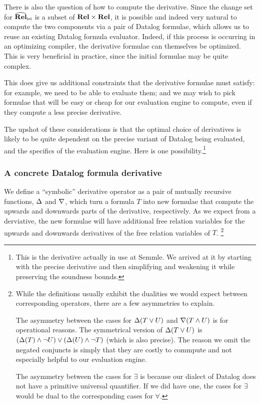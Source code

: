 There is also the question of how to compute the derivative. Since the change
set for $\widehat{\mathbf{Rel}}_{\bowtie}$ is a subset of $\mathbf{Rel} \times \mathbf{Rel}$, it
is possible and indeed very natural to compute the two components via a pair of
Datalog formulae, which allows us to reuse an existing Datalog formula
evaluator. Indeed, if this process is occurring in an optimizing compiler,
the derivative formulae can themselves be optimized. This is very 
beneficial in practice, since the initial formulae may be quite complex.

This does give us additional constraints that the derivative formulae must satisfy:
for example, we need to be able to evaluate them; and we may wish to pick formulae that will be easy or cheap
for our evaluation engine to compute, even if they compute a less precise derivative.

The upshot of these considerations is that the optimal choice of derivatives is likely
to be quite dependent on the precise variant of Datalog being evaluated, and the
specifics of the evaluation engine. Here is one possibility.\footnote{This is
  the derivative actually in use at Semmle. We arrived at it by starting with the
  precise derivative and then simplifying and weakening it while preserving the
  soundness bounds.}

\subsubsection{A concrete Datalog formula derivative}

We define a ``symbolic'' derivative operator as a pair of mutually recursive functions,
$\Delta$ and $\nabla$, which turn a formula $T$ into new formulae that compute
the upwards and downwards parts of the derivative, respectively. As we expect
from a derviative, the new formulae will have additional free relation variables
for the upwards and downwards derivatives of the free relation variables of $T$.
\footnote{While the definitions usually exhibit the dualities we would expect
  between corresponding operators, there are a few asymmetries to explain.

  The asymmetry between the cases for $\Delta(T \vee U)$ and
  $\nabla(T \wedge U)$ is for operational reasons. The symmetrical version of
  $\Delta(T \vee U)$ is $(\Delta(T) \wedge \neg U) \vee (\Delta(U) \wedge \neg
  T)$ (which is also precise). The reason we omit the negated conjuncts is simply
  that they are costly to commpute and not especially helpful to our evaluation engine.

  The asymmetry between the cases for $\exists$ is because our
  dialect of Datalog does not have a primitive universal quantifier.
  If we did have one, the cases for $\exists$ would be dual to the corresponding
  cases for $\forall$.}

